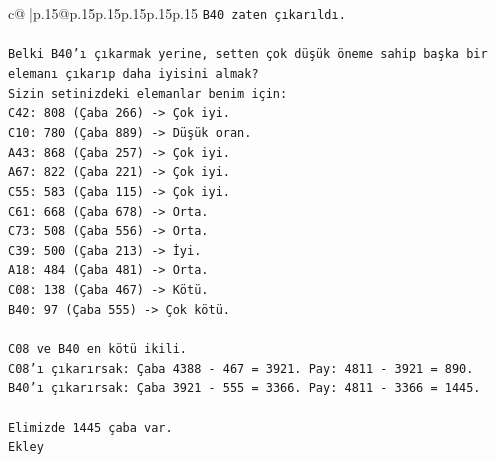 \documentclass{article}
\begin{document}
{\begin{supertabular}{c@{$\;$}|p{.15\linewidth}@{}p{.15\linewidth}p{.15\linewidth}p{.15\linewidth}p{.15\linewidth}p{.15\linewidth}}
{{{\texttt{B40 zaten çıkarıldı.} \\
\\ 
\texttt{Belki B40'ı çıkarmak yerine, setten çok düşük öneme sahip başka bir elemanı çıkarıp daha iyisini almak?} \\
\texttt{Sizin setinizdeki elemanlar benim için:} \\
\texttt{C42: 808 (Çaba 266) {-}> Çok iyi.} \\
\texttt{C10: 780 (Çaba 889) {-}> Düşük oran.} \\
\texttt{A43: 868 (Çaba 257) {-}> Çok iyi.} \\
\texttt{A67: 822 (Çaba 221) {-}> Çok iyi.} \\
\texttt{C55: 583 (Çaba 115) {-}> Çok iyi.} \\
\texttt{C61: 668 (Çaba 678) {-}> Orta.} \\
\texttt{C73: 508 (Çaba 556) {-}> Orta.} \\
\texttt{C39: 500 (Çaba 213) {-}> İyi.} \\
\texttt{A18: 484 (Çaba 481) {-}> Orta.} \\
\texttt{C08: 138 (Çaba 467) {-}> Kötü.} \\
\texttt{B40: 97 (Çaba 555) {-}> Çok kötü.} \\
\\ 
\texttt{C08 ve B40 en kötü ikili.} \\
\texttt{C08'ı çıkarırsak: Çaba 4388 {-} 467 = 3921. Pay: 4811 {-} 3921 = 890.} \\
\texttt{B40'ı çıkarırsak: Çaba 3921 {-} 555 = 3366. Pay: 4811 {-} 3366 = 1445.} \\
\\ 
\texttt{Elimizde 1445 çaba var.} \\
\texttt{Ekley} \\
            }
        }
    }
     \\ \\


\end{supertabular}}
\end{document}
